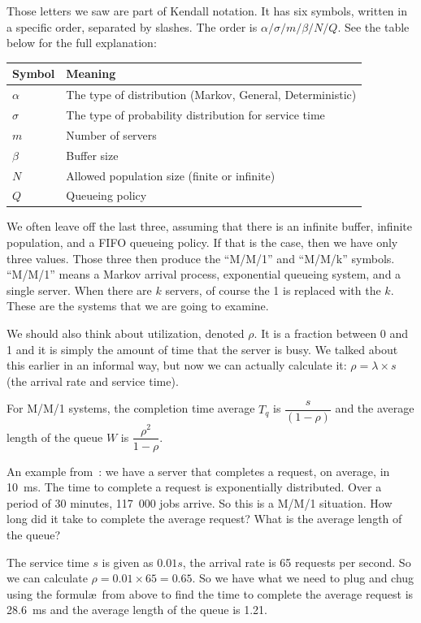 \documentclass[a4paper]{report}
\begin{document}
Those letters we saw are part of Kendall notation. It has six symbols, written in a specific order, separated by slashes. The order is $\alpha / \sigma / m / \beta / N / Q$. See the table below for the full explanation:

\begin{center}
\begin{tabular}{l|l} 
	\textbf{Symbol} & \textbf{Meaning} \\ \hline
	$\alpha$ & The type of distribution (Markov, General, Deterministic) \\ \hline
	$\sigma$ & The type of probability distribution for service time \\ \hline
	$m$ & Number of servers \\ \hline
	$\beta$ & Buffer size \\ \hline
	$N$ & Allowed population size (finite or infinite) \\ \hline
	$Q$ & Queueing policy \\ 
\end{tabular}
\end{center}

We often leave off the last three, assuming that there is an infinite buffer, infinite population, and a FIFO queueing policy. If that is the case, then we have only three values. Those three then produce the ``M/M/1'' and ``M/M/k'' symbols. ``M/M/1'' means a Markov arrival process, exponential queueing system, and a single server. When there are $k$ servers, of course the 1 is replaced with the $k$. These are the systems that we are going to examine.

We should also think about utilization, denoted $\rho$. It is a fraction between 0 and 1 and it is simply the amount of time that the server is busy. We talked about this earlier in an informal way, but now we can actually calculate it: $\rho = \lambda \times s$ (the arrival rate and service time). 

For M/M/1 systems, the completion time average $T_{q}$ is $\dfrac{s}{(1-\rho)}$ and the average length of the queue $W$ is $\dfrac{\rho^{2}}{1-\rho}$.

An example from~\cite{williams-q}: we have a server that completes a request, on average, in 10~ms. The time to complete a request is exponentially distributed. Over a period of 30 minutes, 117~000 jobs arrive. So this is a M/M/1 situation. How long did it take to complete the average request? What is the average length of the queue?

The service time $s$ is given as $0.01s$, the arrival rate is 65 requests per second. So we can calculate $\rho = 0.01 \times 65 = 0.65$. So we have what we need to plug and chug using the formul\ae\ from above to find the time to complete the average request is 28.6~ms and the average length of the queue is 1.21.
\end{document}
